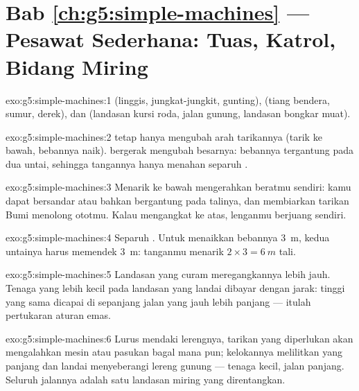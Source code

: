 \section*{Bab \ref{ch:g5:simple-machines} --- Pesawat Sederhana: Tuas, Katrol, Bidang Miring}

\begin{solution}{exo:g5:simple-machines:1}
 (linggis, jungkat-jungkit, gunting),  (tiang bendera,
sumur, derek), dan  (landasan kursi roda, jalan gunung,
landasan bongkar muat).
\end{solution}

\begin{solution}{exo:g5:simple-machines:2}
 tetap hanya mengubah arah tarikannya (tarik ke bawah, bebannya
naik).  bergerak mengubah besarnya: bebannya tergantung pada dua
untai, sehingga tangannya hanya menahan separuh .
\end{solution}

\begin{solution}{exo:g5:simple-machines:3}
Menarik ke bawah mengerahkan beratmu sendiri: kamu dapat bersandar
atau bahkan bergantung pada talinya, dan membiarkan tarikan Bumi
menolong ototmu. Kalau mengangkat ke atas, lenganmu berjuang sendiri.
\end{solution}

\begin{solution}{exo:g5:simple-machines:4}
Separuh . Untuk menaikkan bebannya \qty{3}{m}, kedua untainya
harus memendek \qty{3}{m}: tanganmu menarik $2 \times 3 = \qty{6}{m}$
tali.
\end{solution}

\begin{solution}{exo:g5:simple-machines:5}
Landasan yang curam meregangkannya lebih jauh. Tenaga yang lebih kecil
pada landasan yang landai dibayar dengan jarak: tinggi yang sama
dicapai di sepanjang jalan yang jauh lebih panjang --- itulah
pertukaran aturan emas.
\end{solution}

\begin{solution}{exo:g5:simple-machines:6}
Lurus mendaki lerengnya, tarikan yang diperlukan akan mengalahkan
mesin atau pasukan bagal mana pun; kelokannya melilitkan 
yang panjang dan landai menyeberangi lereng gunung --- tenaga kecil,
jalan panjang. Seluruh jalannya adalah satu landasan miring yang
direntangkan.
\end{solution}

